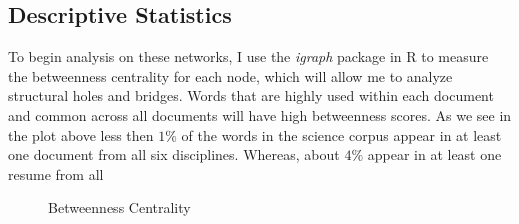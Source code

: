 \documentclass[12pt]{article}
\begin{document}
\subsection{Descriptive Statistics}

To begin analysis on these networks, I use the \textit{igraph} package in R to measure the betweenness centrality for each node, which will allow me to analyze structural holes and bridges. Words that are highly used within each document and common across all documents will have high betweenness scores. As we see in the plot above less then $1\%$ of the words in the science corpus appear in at least one document from all six disciplines. Whereas, about $4\%$ appear in at least one resume from all  
\vspace{2mm}
\begin{figure}[h]
	\hfill
	\hfill
	\hfill
	\caption{Betweenness Centrality}
\end{figure}
\vspace{2mm}
\end{document}
